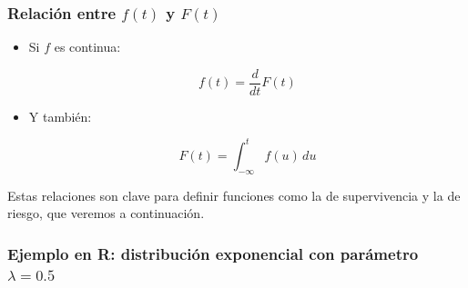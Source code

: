 \documentclass[
  letterpaper,
  DIV=11,
  numbers=noendperiod]{scrartcl}
\begin{document}
\subsubsection{\texorpdfstring{Relación entre \(f(t)\) y
\(F(t)\)}{Relación entre f(t) y F(t)}}\label{relaciuxf3n-entre-ft-y-ft}

\begin{itemize}
\item
  Si \(f\) es continua:

  \[
  f(t) = \frac{d}{dt} F(t)
  \]
\item
  Y también:

  \[
  F(t) = \int_{-\infty}^t f(u) \, du
  \]
\end{itemize}

Estas relaciones son clave para definir funciones como la de
supervivencia y la de riesgo, que veremos a continuación.

\subsubsection{\texorpdfstring{Ejemplo en R: distribución exponencial
con parámetro
\(\lambda=0.5\)}{Ejemplo en R: distribución exponencial con parámetro \textbackslash lambda=0.5}}\label{ejemplo-en-r-distribuciuxf3n-exponencial-con-paruxe1metro-lambda0.5}
\end{document}
